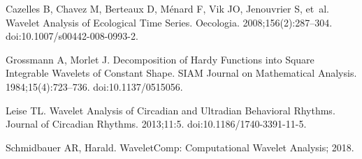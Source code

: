 \documentclass[10pt,letterpaper]{article}\usepackage[]{graphicx}\usepackage[]{color}
\begin{document}
\begin{thebibliography}{10}
	Cazelles B, Chavez M, Berteaux D, M{\'e}nard F, Vik JO, Jenouvrier S, et~al.
	\newblock Wavelet Analysis of Ecological Time Series.
	\newblock Oecologia. 2008;156(2):287--304.
	\newblock doi:{10.1007/s00442-008-0993-2}.
	
	Grossmann A, Morlet J.
	\newblock Decomposition of {{Hardy Functions}} into {{Square Integrable
			Wavelets}} of {{Constant Shape}}.
	\newblock SIAM Journal on Mathematical Analysis. 1984;15(4):723--736.
	\newblock doi:{10.1137/0515056}.
	
	Leise TL.
	\newblock Wavelet Analysis of Circadian and Ultradian Behavioral Rhythms.
	\newblock Journal of Circadian Rhythms. 2013;11:5.
	\newblock doi:{10.1186/1740-3391-11-5}.
	
	Schmidbauer AR, Harald. {{WaveletComp}}: {{Computational Wavelet Analysis}};
	2018.
	
\end{thebibliography}


\end{document}
